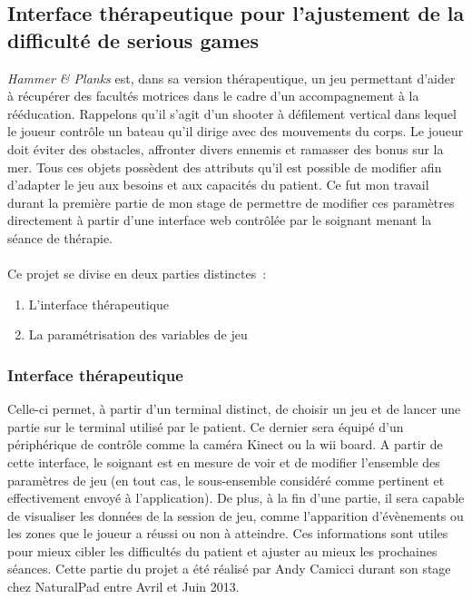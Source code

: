 \subsection{Interface thérapeutique pour l'ajustement de la difficulté de serious games}	
\emph{Hammer \& Planks} est, dans sa version thérapeutique, un jeu permettant d'aider à récupérer des facultés motrices dans le cadre d'un accompagnement à la rééducation. Rappelons qu'il s'agit d'un shooter à défilement vertical dans lequel le joueur contrôle un bateau qu'il dirige avec des mouvements du corps. Le joueur doit éviter des obstacles, affronter divers ennemis et ramasser des bonus sur la mer. Tous ces objets possèdent des attributs qu'il est possible de modifier afin d'adapter le jeu aux besoins et aux capacités du patient. Ce fut mon travail durant la première partie de mon stage de permettre de modifier ces paramètres directement à partir d'une interface web contrôlée par le soignant menant la séance de thérapie.
\paragraph{}
Ce projet se divise en deux parties distinctes~:
\begin{enumerate}
	\item L'interface thérapeutique
	\item La paramétrisation des variables de jeu
\end{enumerate}

	\subsubsection*{Interface thérapeutique}
Celle-ci permet, à partir d'un terminal distinct, de choisir un jeu et de lancer une partie sur le terminal utilisé par le patient. Ce dernier sera équipé d'un périphérique de contrôle comme la caméra Kinect ou la wii board. A partir de cette interface, le soignant est en mesure de voir et de modifier l'ensemble des paramètres de jeu (en tout cas, le sous-ensemble considéré comme pertinent et effectivement envoyé à l'application). De plus, à la fin d'une partie, il sera capable de visualiser les données de la session de jeu, comme l'apparition d'évènements ou les zones que le joueur a réussi ou non à atteindre. Ces informations sont utiles pour mieux cibler les difficultés du patient et ajuster au mieux les prochaines séances. Cette partie du projet a été réalisé par Andy Camicci durant son stage chez NaturalPad entre Avril et Juin 2013.

